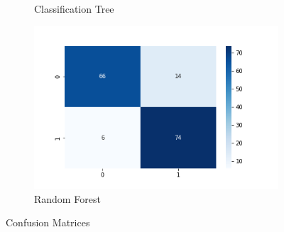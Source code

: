 \documentclass[a4paper, 11pt]{article}
\begin{document}
\begin{figure}
\begin{subfigure}[t]{0.45\textwidth}
        \caption{Classification Tree}\label{dt cm}
    \end{subfigure}
    \begin{subfigure}[t]{0.45\textwidth}
        \centering
        \includegraphics[width=\textwidth]{figures/RandomForest.png}
        \caption{Random Forest}\label{rf cm}
    \end{subfigure}
    \caption{Confusion Matrices}
\end{figure}
\end{document}
